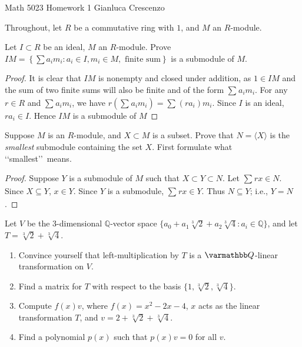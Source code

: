 \documentclass[10pt,oneside,openany]{memoir}
\begin{document}
\homeworktitle
{Math 5023} %
{Homework 1} %
{Gianluca Crescenzo} %

Throughout, let $R$ be a commutative ring with $1$, and $M$ an $R$-module.

\begin{exercise}
	Let $I \subset R$ be an ideal, $M$ an $R$-module. Prove $IM = \left\{\sum a_i m_i : a_i \in I, m_i \in M,\text{ finite sum}\right\}$ is a submodule of $M$.
\end{exercise}
{\color{blue}

	\begin{proof}
		It is clear that $IM$ is nonempty and closed under addition, as $1 \in IM$ and the sum of two finite sums will also be finite and of the form $\sum_{}^{} a_i m_i$. For any $r \in R$ and $\sum_{}^{} a_i m_i$, we have $r \left( \sum_{}^{} a_i m_i \right) = \sum_{}^{} (ra_i)m_i$. Since $I$ is an ideal, $ra_i \in I$. Hence $IM$ is a submodule of $M$
	\end{proof}
}
\begin{exercise}
	Suppose $M$ is an $R$-module, and $X \subset M$ is a subset. Prove that
$N = \langle X\rangle$ is the \textit{smallest} submodule containing the set $X$.
First formulate what \lq\lq smallest\rq\rq\ means.
\end{exercise}
{\color{blue}

	\begin{proof}
		Suppose $Y$ is a submodule of $M$ such that $X \subset Y \subset N$. Let $\sum_{}^{} rx \in N$. Since $X \subseteq Y$, $x \in Y$. Since $Y$ is a submodule, $\sum_{}^{} rx \in Y$. Thus $N \subseteq Y$; i.e., $Y = N$.
	\end{proof}
}
\begin{exercise}
	Let $V$ be the 3-dimensional $\mathbb{Q}$-vector space $\{a_0+a_1\sqrt[3]{2}+a_2\sqrt[3]{4}:a_i\in\mathbb{Q}\}$, and let $T=\sqrt[3]{2}+\sqrt[3]{4}$.
	\mbox{}
	\begin{enumerate}[label = (\alph*),itemsep=1pt,topsep=3pt]
		\item Convince yourself that left-multiplication by $T$ is a $\bfQ$-linear transformation on $V$. 
		\item Find a matrix for $T$ with respect to the basis $\{1,\sqrt[3]{2},\sqrt[3]{4}\}$.
		\item Compute $f(x)v$, where $f(x)=x^2-2x-4$, $x$ acts as the linear transformation $T$, and $v=2+\sqrt[3]{2}+\sqrt[3]{4}$.
		\item Find a polynomial $p(x)$ such that $p(x)v=0$ for all $v$.
	\end{enumerate}
\end{exercise}
\end{document}
